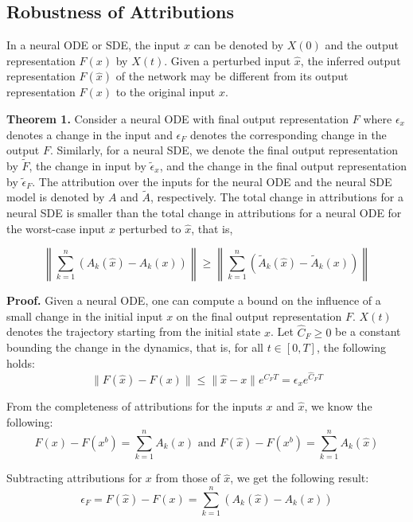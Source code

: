 \documentclass[10pt,twocolumn]{article}
\begin{document}
\subsection{Robustness of Attributions}

In a neural ODE or SDE, the input $x$ can be denoted by $X(0)$ and the output representation $F(x)$ by $X(t)$. Given a perturbed input $\hat{x}$, the inferred output representation $F(\hat{x})$ of the network may be different from its output representation $F(x)$ to the original input $x$.

\textbf{Theorem 1.} Consider a neural ODE with final output representation $F$ where $\epsilon_x$ denotes a change in the input and $\epsilon_F$ denotes the corresponding change in the output $F$. Similarly, for a neural SDE, we denote the final output representation by $\tilde{F}$, the change in input by $\tilde{\epsilon}_x$, and the change in the final output representation by $\tilde{\epsilon}_F$. The attribution over the inputs for the neural ODE and the neural SDE model is denoted by $A$ and $\tilde{A}$, respectively. The total change in attributions for a neural SDE is smaller than the total change in attributions for a neural ODE for the worst-case input $x$ perturbed to $\hat{x}$, that is,

\begin{equation}
\left\|\sum^n_{k=1} (A_k(\hat{x}) - A_k(x))\right\| \geq \left\|\sum^n_{k=1} (\tilde{A}_k(\hat{x}) - \tilde{A}_k(x))\right\|
\end{equation}

\textbf{Proof.} Given a neural ODE, one can compute a bound on the influence of a small change in the initial input $x$ on the final output representation $F$. $X(t)$ denotes the trajectory starting from the initial state $x$. Let $\hat{C}_F \geq 0$ be a constant bounding the change in the dynamics, that is, for all $t \in [0, T]$, the following holds:
\begin{equation}
\|F(\hat{x}) - F(x)\| \leq \|\hat{x} - x\| e^{\hat{C}_F T} = \epsilon_x e^{\hat{C}_F T}
\end{equation}

From the completeness of attributions for the inputs $x$ and $\hat{x}$, we know the following:
\begin{equation}
F(x)-F(x^b) = \sum^n_{k=1} A_k(x) \text{ and } F(\hat{x})-F(x^b) = \sum^n_{k=1} A_k(\hat{x})
\end{equation}

Subtracting attributions for $x$ from those of $\hat{x}$, we get the following result:
\begin{equation}
\epsilon_F = F(\hat{x}) - F(x) = \sum^n_{k=1} (A_k(\hat{x}) - A_k(x))
\end{equation}
\end{document}
